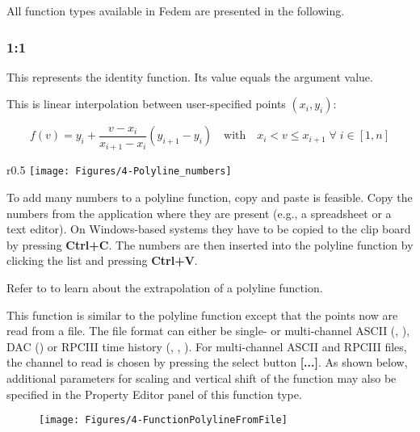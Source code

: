 
All function types available in Fedem are presented in the following.

\subsubsection{1:1}

This represents the identity function. Its value equals the argument value.


This is linear interpolation between user-specified points $(x_i, y_i)$:

$$
  f(v) = y_i + \frac{v-x_i}{x_{i+1} - x_i}(y_{i+1}-y_i)
  \quad\mbox{with}\quad
  x_i < v \leq x_{i+1} \;\forall\; i\in[1,n]
$$

\begin{wrapfigure}[9]{r}{0.5\textwidth}
  \vspace{-12mm}
  \texttt{[image: Figures/4-Polyline\_numbers]}
\end{wrapfigure}

To add many numbers to a polyline function, copy and paste is feasible.
Copy the numbers from the application where they are present (e.g., a
spreadsheet or a text editor). On Windows-based systems they have to be copied
to the clip board by pressing \textbf{Ctrl+C}. The numbers are then inserted
into the polyline function by clicking the list and pressing \textbf{Ctrl+V}.

Refer to  to learn about the
extrapolation of a polyline function.


This function is similar to the polyline function except that the points now are
read from a file. The file format can either be single- or multi-channel
ASCII (, ), DAC () or RPCIII time history
(, , ).
For multi-channel ASCII and RPCIII files, the channel to read is chosen by
pressing the select button \textbf{[...]}. As shown below,
additional parameters for scaling and vertical shift of the function may also
be specified in the Property Editor panel of this function type.

\clearpage
\begin{figure}[H]
  \texttt{[image: Figures/4-FunctionPolylineFromFile]}
\end{figure}

